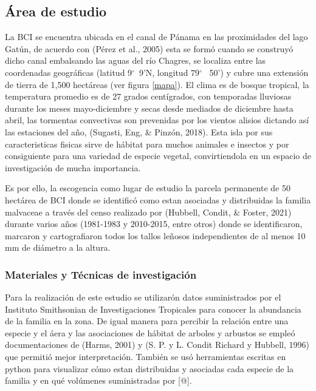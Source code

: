 \documentclass[11pt,]{article}
\begin{document}
\subsection{Área de estudio}\label{uxe1rea-de-estudio}

La BCI se encuentra ubicada en el canal de Pánama en las proximidades
del lago Gatún, de acuerdo con (Pérez et al., 2005) esta se formó cuando
se construyó dicho canal embalsando las aguas del río Chagres, se
localiza entre las coordenadas geográficas (latitud 9\(^\circ\)~9'N,
longitud 79\(^\circ\)~ 50') y cubre una extensión de tierra de 1,500
hectáreas (ver figura \ref{mapa}). El clima es de bosque tropical, la
temperatura promedio es de 27 grados centígrados, con temporadas
lluviosas durante los meses mayo-diciembre y secas desde mediados de
diciembre hasta abril, las tormentas convectivas son prevenidas por los
vientos alisios dictando así las estaciones del año, (Sugasti, Eng, \&
Pinzón, 2018). Esta isla por sus caracteristicas fisicas sirve de
hábitat para muchos animales e insectos y por consiguiente para una
variedad de especie vegetal, convirtiendola en un espacio de
investigación de mucha importancia.

Es por ello, la escogencia como lugar de estudio la parcela permanente
de 50 hectárea de BCI donde se identificó como estan asociadas y
distribuidas la familia malvaceae a través del censo realizado por
(Hubbell, Condit, \& Foster, 2021) durante varios años (1981-1983 y
2010-2015, entre otros) donde se identificaron, marcaron y
cartografiaron todos los tallos leñosos independientes de al menos 10 mm
de diámetro a la altura.

\subsubsection{Materiales y Técnicas de
investigación}\label{materiales-y-tuxe9cnicas-de-investigaciuxf3n}

Para la realización de este estudio se utilizarón datos suministrados
por el Instituto Smithsonian de Investigaciones Tropicales para conocer
la abundancia de la familia en la zona. De igual manera para percibir la
relación entre una especie y el áera y las asociaciones de hábitat de
arboles y arbustos se empleó documentaciones de (Harms, 2001) y (S. P. y
L. Condit Richard y Hubbell, 1996) que permitió mejor interpretación.
También se usó herramientas escritas en python para visualizar cómo
estan distribuidas y asociadas cada especie de la familia y en qué
volúmenes suministradas por {[}@{]}.
\end{document}
